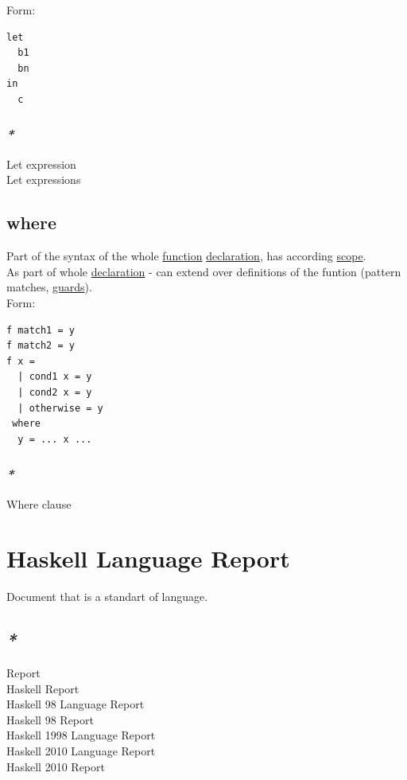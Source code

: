 \documentclass[a4paper,14pt,oneside]{book}
\begin{document}
{Form:\\
\begin{verbatim}
let
  b1
  bn
in
  c
\end{verbatim}

\subsubsection{\emph{*}}
\label{sec:orgc236f98}

\label{org7da65de}Let expression\\
\label{orgfde06ef}Let expressions\\

\subsection{\label{org5b6b021}where}
\label{sec:orgeef7eb4}
Part of the syntax of the whole \hyperref[org6a60524]{function} \hyperref[org07f2519]{declaration}, has according \hyperref[orgd4e671a]{scope}.\\

As part of whole \hyperref[org07f2519]{declaration} - can extend over definitions of the funtion (pattern matches, \hyperref[org1d2fe81]{guards}).\\

Form:\\
\begin{verbatim}
f match1 = y
f match2 = y
f x =
  | cond1 x = y
  | cond2 x = y
  | otherwise = y
 where
  y = ... x ...
\end{verbatim}

\subsubsection{\emph{*}}
\label{sec:orgb5d8ea6}

\label{orgf926161}Where clause\\

\section{\label{orgf7ff82f}Haskell Language Report}
\label{sec:org17f1cfd}
Document that is a standart of language.\\

\subsection{\emph{*}}
\label{sec:org15c061f}
\label{orgf2d9da9}Report\\
\label{orgc5f31f3}Haskell Report\\
\label{org56ef251}Haskell 98 Language Report\\
\label{org9500758}Haskell 98 Report\\
\label{orgafdee69}Haskell 1998 Language Report\\
\label{org35bb5d4}Haskell 2010 Language Report\\
\label{orgb751a99}Haskell 2010 Report\\

}
\end{document}
